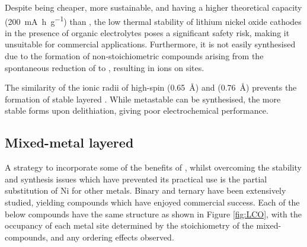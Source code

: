 \begin{labeling}{\textbf{}}
	\item [\textbf{\ce{LiNiO2}}] Despite being cheaper, more sustainable, and having a higher theoretical capacity (\SI{200}{\milli\ampere\hour\per\gram}) than , the low thermal stability of lithium nickel oxide cathodes in the presence of organic electrolytes poses a significant safety risk, making it unsuitable for commercial applications.
	Furthermore, it is not easily synthesised due to the formation of non-stoichiometric compounds arising from the spontaneous reduction of  to  , resulting in  ions on  sites.
	\item [\textbf{\ce{LiMnO2}}] The similarity of the ionic radii of high-spin  (\SI{0.65}{\angstrom}) and  (\SI{0.76}{\angstrom}) prevents the formation of stable layered .
	While metastable  can be synthesised, the more stable  forms upon delithiation, giving poor electrochemical performance.
\end{labeling}

\subsection{Mixed-metal layered }
A strategy to incorporate some of the benefits of , whilst overcoming the stability and synthesis issues which have prevented its practical use is the partial substitution of Ni for other metals.
Binary and ternary  have been extensively studied, yielding compounds which have enjoyed commercial success.
Each of the below compounds have the same structure as  shown in Figure \ref{fig:LCO}, with the occupancy of each metal site determined by the stoichiometry of the mixed-compounds, and any ordering effects observed.

